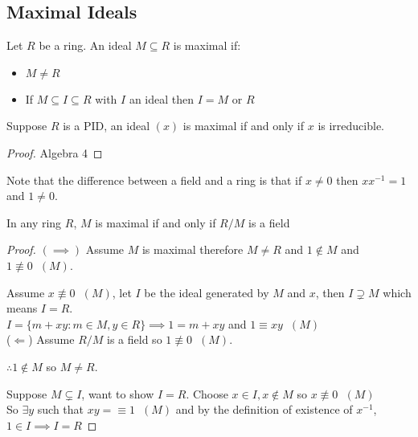 \documentclass[11pt]{article}
\begin{document}
\subsection{Maximal Ideals}

\begin{defn}
Let $R$ be a ring.
An ideal $M \subseteq R$ is maximal if:
	\begin{itemize}
		\item{$M \neq R$}
		\item{If $M \subseteq I \subseteq R $ with $I$ an ideal then $I=M $ or $R$}
	\end{itemize}
\end{defn}


\begin{prop}
	Suppose $R$ is a PID, an ideal $(x)$ is maximal if and only if $x$ is irreducible.
\end{prop}
\begin{proof}
Algebra 4
\end{proof}
$ $\\[-1em]
Note that the difference between a field and a ring is that if $x \neq 0$ then $xx^{-1} = 1$ and $1 \neq 0$.
\begin{prop}
In any ring $R$, $M$ is maximal if and only if $R/M$ is a field
\end{prop}
\begin{proof}
	$(\implies)$ Assume $M$ is maximal therefore $M \neq R$ and $1 \not \in M$ and $1 \not \equiv 0 \hspace{7pt} (M)$.


	Assume $x \not \equiv 0 \hspace{7pt}(M)$, let $I$ be the ideal generated by $M$ and $x$, then $ I \supsetneq M$ which means $I=R$.
	$ $\\[1em]
	$I = \{ m + xy : m \in M, y \in R \} \implies 1 = m + xy $ and $ 1 \equiv xy \hspace{7pt}(M)$
	$ $\\[1em]
	($\Longleftarrow$) Assume $R/M$ is a field so $1 \not \equiv 0 \hspace{7pt} (M)$.

	$\therefore 1 \not \in M$ so $M \neq R$.

	Suppose $M \subsetneq I$, want to show $I=R$.
	Choose $x \in I, x \not \in M $ so $x \not \equiv 0 \hspace{7pt }(M)$
	$ $\\[0.5em]
	So $\exists y $ such that $xy = \equiv 1 \hspace{7pt} (M) $ and by the definition of existence of $x^{-1}$, $1 \in I \implies I = R$
\end{proof}
\end{document}
